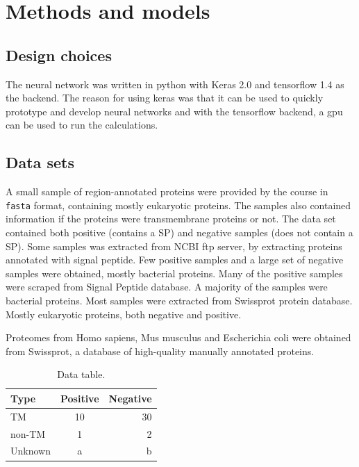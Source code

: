 
\section{Methods and models}

\subsection{Design choices}
The neural network was written in python with Keras 2.0 and tensorflow 1.4 as the backend. The reason for using keras was that it can be used to quickly prototype and develop neural networks and with the tensorflow backend, a gpu can be used to run the calculations.

\subsection{Data sets}

A small sample of region-annotated proteins were provided by the course in \verb|fasta| format, containing mostly eukaryotic proteins. The samples also contained information if the proteins were transmembrane proteins or not. The data set contained both positive (contains a SP) and negative samples (does not contain a SP).
Some samples was extracted from NCBI ftp server, by extracting proteins annotated with signal peptide. Few positive samples and a large set of negative samples were obtained, mostly bacterial proteins.
Many of the positive samples were scraped from Signal Peptide database. A majority of the samples were bacterial proteins.
Most samples were extracted from Swissprot protein database. Mostly eukaryotic proteins, both negative and positive.

Proteomes from Homo sapiens, Mus musculus and Escherichia coli were obtained from Swissprot, a database of high-quality manually annotated proteins. 

\begin{table}[H]
\centering
\begin{tabular}{l | c | r} %
Type & Positive & Negative \\\hline
TM & 10 & 30 \\
non-TM & 1 & 2 \\
Unknown & a & b
\end{tabular}
\caption{\label{tab:datatable}Data table.}
\end{table}

